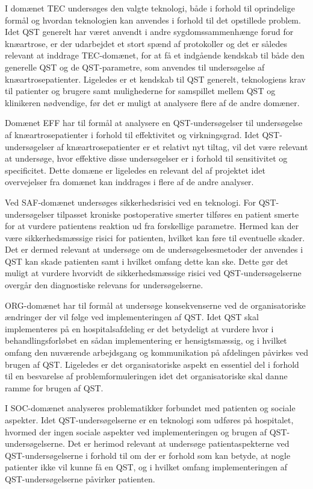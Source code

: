 I domænet TEC undersøges den valgte teknologi, både i forhold til oprindelige formål og hvordan teknologien kan anvendes i forhold til det opstillede problem. Idet QST generelt har været anvendt i andre sygdomssammenhænge forud for knæartrose, er der udarbejdet et stort spænd af protokoller og det er således relevant at inddrage TEC-domænet, for at få et indgående kendskab til både den generelle QST og de QST-parametre, som anvendes til undersøgelse af knæartrosepatienter. Ligeledes er et kendskab til QST generelt, teknologiens krav til patienter og brugere samt mulighederne for samspillet mellem QST og klinikeren nødvendige, før det er muligt at analysere flere af de andre domæner. 

Domænet EFF har til formål at analysere en QST-undersøgelser til undersøgelse af knæartrosepatienter i forhold til effektivitet og virkningsgrad. Idet QST-undersøgelser af knæartrosepatienter er et relativt nyt tiltag, vil det være relevant at undersøge, hvor effektive disse undersøgelser er i forhold til sensitivitet og specificitet. Dette domæne er ligeledes en relevant del af projektet idet overvejelser fra domænet kan inddrages i flere af de andre analyser.   

Ved SAF-domænet undersøges sikkerhedsrisici ved en teknologi. For QST-undersøgelser tilpasset kroniske postoperative smerter tilføres en patient smerte for at vurdere patientens reaktion ud fra forskellige parametre. Hermed kan der være sikkerhedsmæssige risici for patienten, hvilket kan føre til eventuelle skader. Det er dermed relevant at undersøge om de undersøgelsesmetoder der anvendes i QST kan skade patienten samt i hvilket omfang dette kan ske. Dette gør det muligt at vurdere hvorvidt de sikkerhedsmæssige risici ved QST-undersøgelserne overgår den diagnostiske relevans for undersøgelserne. 

ORG-domænet har til formål at undersøge konsekvenserne ved de organisatoriske ændringer der vil følge ved implementeringen af QST. Idet QST skal implementeres på en hospitalsafdeling er det betydeligt at vurdere hvor i behandlingsforløbet en sådan implementering er hensigtsmæssig, og i hvilket omfang den nuværende arbejdsgang og kommunikation på afdelingen påvirkes ved brugen af QST. Ligeledes er det organisatoriske aspekt en essentiel del i forhold til en besvarelse af problemformuleringen idet det organisatoriske skal danne ramme for brugen af QST.

I SOC-domænet analyseres problematikker forbundet med patienten og sociale aspekter. Idet QST-undersøgelserne er en teknologi som udføres på hospitalet, hvormed der ingen sociale aspekter ved implementeringen og brugen af QST-undersøgelserne. Det er herimod relevant at undersøge patientaspekterne ved QST-undersøgelserne i forhold til om  der er forhold som kan betyde, at nogle patienter ikke vil kunne få en QST, og i hvilket omfang implementeringen af QST-undersøgelserne påvirker patienten.

